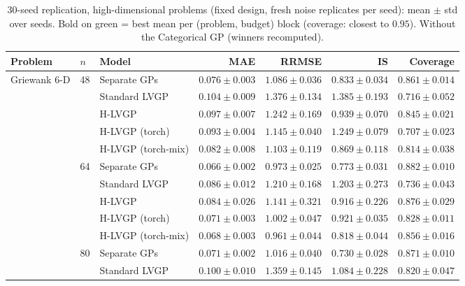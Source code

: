 \begin{table}[htbp]
\centering
\small
%
\setlength{\tabcolsep}{3pt}
\caption{30-seed replication, high-dimensional problems (fixed design, fresh noise replicates per seed): mean $\pm$ std over seeds. Bold on green = best mean per (problem, budget) block (coverage: closest to $0.95$). Without the Categorical GP (winners recomputed).}
\label{tab:seeds_hd_nocat}
\begin{tabular}{lllrrrr}
\toprule
Problem & $n$ & Model & MAE & RRMSE & IS & Coverage \\
\midrule
\multirow{25}{*}{Griewank 6-D} & \multirow{5}{*}{48} & Separate GPs & \colorbox{green!20}{\boldmath$0.076 \pm 0.003$} & \colorbox{green!20}{\boldmath$1.086 \pm 0.036$} & \colorbox{green!20}{\boldmath$0.833 \pm 0.034$} & \colorbox{green!20}{\boldmath$0.861 \pm 0.014$} \\
 &  & Standard LVGP & $0.104 \pm 0.009$ & $1.376 \pm 0.134$ & $1.385 \pm 0.193$ & $0.716 \pm 0.052$ \\
 &  & H-LVGP & $0.097 \pm 0.007$ & $1.242 \pm 0.169$ & $0.939 \pm 0.070$ & $0.845 \pm 0.021$ \\
 &  & H-LVGP (torch) & $0.093 \pm 0.004$ & $1.145 \pm 0.040$ & $1.249 \pm 0.079$ & $0.707 \pm 0.023$ \\
 &  & H-LVGP (torch-mix) & $0.082 \pm 0.008$ & $1.103 \pm 0.119$ & $0.869 \pm 0.118$ & $0.814 \pm 0.038$ \\
\cmidrule(lr){2-7}
 & \multirow{5}{*}{64} & Separate GPs & \colorbox{green!20}{\boldmath$0.066 \pm 0.002$} & $0.973 \pm 0.025$ & \colorbox{green!20}{\boldmath$0.773 \pm 0.031$} & \colorbox{green!20}{\boldmath$0.882 \pm 0.010$} \\
 &  & Standard LVGP & $0.086 \pm 0.012$ & $1.210 \pm 0.168$ & $1.203 \pm 0.273$ & $0.736 \pm 0.043$ \\
 &  & H-LVGP & $0.084 \pm 0.026$ & $1.141 \pm 0.321$ & $0.916 \pm 0.226$ & $0.876 \pm 0.029$ \\
 &  & H-LVGP (torch) & $0.071 \pm 0.003$ & $1.002 \pm 0.047$ & $0.921 \pm 0.035$ & $0.828 \pm 0.011$ \\
 &  & H-LVGP (torch-mix) & $0.068 \pm 0.003$ & \colorbox{green!20}{\boldmath$0.961 \pm 0.044$} & $0.818 \pm 0.044$ & $0.856 \pm 0.016$ \\
\cmidrule(lr){2-7}
 & \multirow{5}{*}{80} & Separate GPs & $0.071 \pm 0.002$ & \colorbox{green!20}{\boldmath$1.016 \pm 0.040$} & \colorbox{green!20}{\boldmath$0.730 \pm 0.028$} & $0.871 \pm 0.010$ \\
 &  & Standard LVGP & $0.100 \pm 0.010$ & $1.359 \pm 0.145$ & $1.084 \pm 0.228$ & $0.820 \pm 0.047$ \\

\end{tabular}
\end{table}
